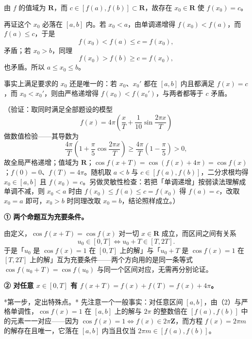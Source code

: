 \begin{answer}
由 \(f\) 的值域为 \(\mathbf{R}\)，而 \(c\in[f(a),f(b)]\subset\mathbf{R}\)，故存在 \(x_{0}\in\mathbf{R}\) 使 \(f(x_{0})=c\)。

再证这个 \(x_{0}\) 必落在 \([a,b]\) 内。若 \(x_{0}<a\)，由单调递增得 \(f(x_{0})<f(a)\)，而 \(f(a)\leqslant c\)，于是
\nopagebreak[4]
\[
f(x_{0})<f(a)\leqslant c=f(x_{0}),
\]
矛盾；若 \(x_{0}>b\)，同理
\nopagebreak[4]
\[
f(x_{0})>f(b)\geqslant c=f(x_{0}),
\]
也矛盾。所以 \(a\leqslant x_{0}\leqslant b\)。

事实上满足要求的 \(x_{0}\) 还是唯一的：若 \(x_{0}\)、\(x_{0}'\) 都在 \([a,b]\) 内且都满足 \(f(x)=c\)，而 \(x_{0}<x_{0}'\)，则由严格递增得 \(f(x_{0})<f(x_{0}')\)，与两者都等于 \(c\) 矛盾。

（验证：取同时满足全部题设的模型
\nopagebreak[4]
\[
f(x)=4\pi\left(\frac{x}{T}+\frac{1}{10}\sin\frac{2\pi x}{T}\right)
\]
做数值检验——其导数为
\nopagebreak[4]
\[
\frac{4\pi}{T}\left(1+\frac{\pi}{5}\cos\frac{2\pi x}{T}\right)\geqslant\frac{4\pi}{T}\left(1-\frac{\pi}{5}\right)>0,
\]
故全局严格递增；值域为 \(\mathbf{R}\)；\(\cos f(x+T)=\cos(f(x)+4\pi)=\cos f(x)\)；\(f(0)=0\)、\(f(T)=4\pi\)。随机取 \(a<b\) 与 \(c\in[f(a),f(b)]\)，二分求根均得 \(x_{0}\in[a,b]\) 且 \(f(x_{0})=c\)。另做灵敏性检查：若把「单调递增」按弱读法理解成单调不减，则 \(x_{0}<a\) 时由 \(f(x_{0})\leqslant f(a)\leqslant c=f(x_{0})\) 得 \(f(a)=c\)，改取 \(x_{0}=a\) 即可，\(x_{0}>b\) 时同理改取 \(x_{0}=b\)，结论照样成立。）


\textbf{① 两个命题互为充要条件。}

由定义，\(\cos f(x+T)=\cos f(x)\) 对一切 \(x\in\mathbf{R}\) 成立，而区间之间有关系
\nopagebreak[4]
\[
u_{0}\in[0,T]\iff u_{0}+T\in[T,2T].
\]
于是「\(u_{0}\) 是 \(\cos f(x)=1\) 在 \([0,T]\) 上的解」与「\(u_{0}+T\) 是 \(\cos f(x)=1\) 在 \([T,2T]\) 上的解」互为充要条件——两个方向用的是同一条等式 \(\cos f(u_{0}+T)=\cos f(u_{0})\) 与同一个区间对应，无需再分别论证。

\textbf{② 对任意 \(x\in[0,T]\) 有 \(f(x+T)=f(x)+f(T)=f(x)+4\pi\)。}

*第一步，定出特殊点。* 先注意一个一般事实：对任意区间 \([a,b]\)，由（2）与严格单调性，\(\cos f(x)=1\) 在 \([a,b]\) 上的解与 \(2\pi\) 的整数倍在 \([f(a),f(b)]\) 中的元素一一对应——因为 \(\cos f(x)=1\iff f(x)\in2\pi\mathbf{Z}\)，而方程 \(f(x)=2\pi m\) 的解存在且唯一，它落在 \([a,b]\) 内当且仅当 \(2\pi m\in[f(a),f(b)]\)。


\end{answer}
